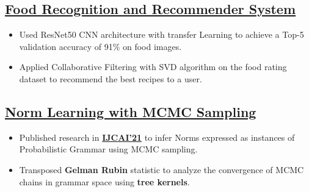 \documentclass[a4,10pt]{article}
\newenvironment{zitemize}{
\begin{itemize}\itemsep0pt \parskip0pt \parsep1pt}
{\end{itemize}\vspace{-0.4cm}}
\begin{document}



    
\subsection*{\href{https://github.com/ML-7641-Fall-2022/RoboChef}{Food Recognition and Recommender System} \hfill {\normalsize{}}} 
\vspace{0.043cm}
    \begin{zitemize}
        \item Used ResNet50 CNN architecture with transfer Learning to achieve a Top-5 validation accuracy of 91\% on food images. 
        \item Applied Collaborative Filtering with SVD algorithm on the food rating dataset to recommend the best recipes to a user.
    \end{zitemize}

\subsection*{\href{https://github.com/ashish1610dhiman/learning_norms_with_mcmc_from_pcfg_IJCAI21}{Norm Learning with MCMC Sampling} \hfill {\normalsize{}}} 
\vspace{0.043cm}
    \begin{zitemize}
        \item Published research in \href{https://www.ijcai.org/proceedings/2021/17}{\textbf{IJCAI'21}} to infer Norms expressed as instances of Probabilistic Grammar using MCMC sampling. 
        \item Transposed \textbf{Gelman Rubin} statistic to analyze the convergence of MCMC chains in grammar space using \textbf{tree kernels}. 
    \end{zitemize}
\end{document}

